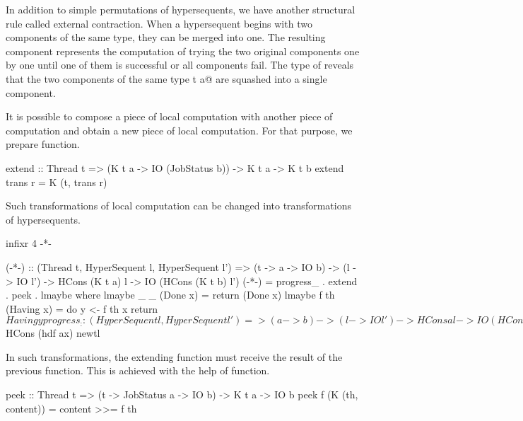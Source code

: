In addition to simple permutations of hypersequents, we have another
structural rule called external contraction.  When a hypersequent begins
with two components of the same type, they can be merged into one.  The
resulting component represents the computation of trying the two original
components one by one until one of them is successful or all components
fail.
The type of \verb@choice@ reveals that the two components of the same type
\verb@K t a@ are squashed into a single component.

It is possible to compose a piece of local computation with another
piece of computation
and obtain a new piece of local computation.
For that purpose, we prepare \verb@extend@ function.
\begin{code}
extend :: Thread t => (K t a -> IO (JobStatus b)) -> K t a -> K t b
extend trans r = K (t, trans r)
\end{code}
Such transformations of local computation can be changed into
transformations of hypersequents.
\begin{code}
infixr 4 -*-

(-*-) :: (Thread t, HyperSequent l, HyperSequent l') =>
            (t -> a -> IO b) -> (l -> IO l') ->
            HCons (K t a) l -> IO (HCons (K t b) l')
(-*-) = progress_ . extend . peek . lmaybe
  where
    lmaybe _ _  (Done x) = return (Done x)
    lmaybe f th (Having x) =  do
      y <- f th x
      return $ Having y

progress_ :: (HyperSequent l, HyperSequent l') =>
            (a -> b) -> (l -> IO l') -> HCons a l ->
            IO (HCons b l')
progress_ hdf tlf (HCons ax bl) = do
  newtl <- tlf bl
  return $ HCons (hdf ax) newtl
\end{code}

In such transformations,
the extending function must receive the result of the previous function.
This is achieved with the help of \verb@peek@ function.
\begin{code}
peek :: Thread t => (t -> JobStatus a -> IO b) -> K t a -> IO b
peek f (K (th, content)) = content >>= f th
\end{code}

